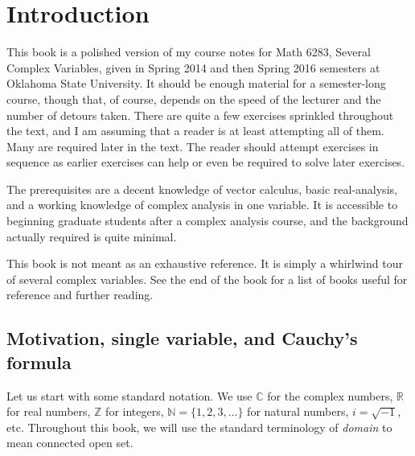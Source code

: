 \documentclass[12pt,openany]{book}
\newcommand{\C}{{\mathbb{C}}}
\newcommand{\R}{{\mathbb{R}}}
\newcommand{\Z}{{\mathbb{Z}}}
\newcommand{\N}{{\mathbb{N}}}
\newcommand{\myindex}[1]{#1\index{#1}}
\theoremstyle{plain}
\theoremstyle{remark}
\theoremstyle{definition}
\theoremstyle{exercise}
\theoremstyle{example}
\begin{document}

\chapter*{Introduction}


This book is a polished version of my course notes for Math 6283, Several
Complex Variables, given in
Spring 2014 and then Spring 2016 semesters at Oklahoma State University.
It should be enough material for a semester-long course,
though that,
of course, depends on the speed of the lecturer and the number of detours taken.
There are quite a few
exercises sprinkled throughout the text, and I am assuming that a reader is
at least attempting all of them.  Many are required later in the
text.  The reader should attempt exercises in sequence as earlier exercises
can help or even be required to solve later exercises.

The prerequisites are a decent knowledge of vector calculus, basic
real-analysis, and a working knowledge of complex analysis in one variable.
It is accessible to beginning graduate students after a complex
analysis course, and the background actually required is quite minimal.

This book is not meant as an exhaustive reference.  It is simply a whirlwind
tour of several complex variables.  See the end of the book
for a list of books useful for
reference and further reading.


\section{Motivation, single variable, and Cauchy's formula} \label{sec:motivation}


Let us start with some standard notation.
We use $\C$ for the complex numbers, $\R$
for real numbers,
$\Z$ for integers,
$\N = \{ 1,2,3,\ldots \}$ for natural
numbers,
$i = \sqrt{-1}$, etc.  Throughout this book, we will use
the standard terminology of \emph{\myindex{domain}} to mean connected open
set.
\end{document}
